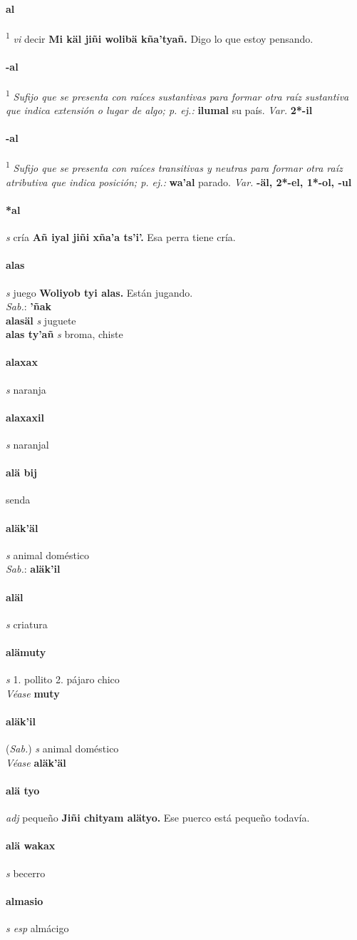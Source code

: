 \documentclass{scrbook}
\newcommand{\entry}[1]{\paragraph{#1}}
\newcommand{\onedefinition}[1]{#1.}
\newcommand{\defsuperscript}[1]{\textsuperscript{1}}
\newcommand{\nontranslationdef}[1]{\textit{#1}}
\newcommand{\partofspeech}[1]{\textit{#1}}
\newcommand{\spanishtranslation}[1]{#1}
\newcommand{\cholexample}[1]{\textbf{#1}}
\newcommand{\exampletranslation}[1]{#1}
\newcommand{\dialectvariant}[1]{\\\textit{#1}:}
\newcommand{\dialectword}[1]{\textbf{#1}}
\newcommand{\alsosee}[1]{\\\textit{Véase} \textbf{#1}}
\newcommand{\relevantdialect}[1]{(\textit{#1})}
\newcommand{\secondaryentry}[1]{\\\textbf{#1}}
\newcommand{\secondpartofspeech}[1]{\textit{#1}}
\newcommand{\secondtranslation}[1]{#1}
\newcommand{\variation}[1]{\textit{Var.} \textbf{#1}}
\begin{document}
\begin{multicols}{2}
\entry{al}
\defsuperscript{2}
\partofspeech{vi}
\spanishtranslation{decir}
\cholexample{Mi käl jiñi wolibä kña'tyañ.}
\exampletranslation{Digo lo que estoy pensando.}

\entry{-al}
\defsuperscript{1}
\nontranslationdef{Sufijo que se presenta con raíces sustantivas para formar otra raíz sustantiva que indica extensión o lugar de algo; p. ej.:}
\cholexample{ilumal}
\exampletranslation{su país.}
\variation{2*-il}

\entry{-al}
\defsuperscript{2}
\nontranslationdef{Sufijo que se presenta con raíces transitivas y neutras para formar otra raíz atributiva que indica posición; p. ej.:}
\cholexample{wa'al}
\exampletranslation{parado.}
\variation{-äl, 2*-el, 1*-ol, -ul}

\entry{*al}
\partofspeech{s}
\spanishtranslation{cría}
\cholexample{Añ iyal jiñi xña'a ts'i'.}
\exampletranslation{Esa perra tiene cría.}

\entry{alas}
\partofspeech{s}
\spanishtranslation{juego}
\cholexample{Woliyob tyi alas.}
\exampletranslation{Están jugando.}
\dialectvariant{Sab.}
\dialectword{'ñak}
\secondaryentry{alasäl}
\secondpartofspeech{s}
\secondtranslation{juguete}
\secondaryentry{alas ty'añ}
\secondpartofspeech{s}
\secondtranslation{broma, chiste}

\entry{alaxax}
\partofspeech{s}
\spanishtranslation{naranja}

\entry{alaxaxil}
\partofspeech{s}
\spanishtranslation{naranjal}

\entry{alä bij}
\spanishtranslation{senda}

\entry{aläk'äl}
\partofspeech{s}
\spanishtranslation{animal doméstico}
\dialectvariant{Sab.}
\dialectword{aläk'il}

\entry{aläl}
\partofspeech{s}
\spanishtranslation{criatura}

\entry{alämuty}
\partofspeech{s}
\onedefinition{1}
\spanishtranslation{pollito}
\onedefinition{2}
\spanishtranslation{pájaro chico}
\alsosee{muty}

\entry{aläk'il}
\relevantdialect{Sab.}
\partofspeech{s}
\spanishtranslation{animal doméstico}
\alsosee{aläk'äl}

\entry{alä tyo}
\partofspeech{adj}
\spanishtranslation{pequeño}
\cholexample{Jiñi chityam alätyo.}
\exampletranslation{Ese puerco está pequeño todavía.}

\entry{alä wakax}
\partofspeech{s}
\spanishtranslation{becerro}

\entry{almasio}
\partofspeech{s esp}
\spanishtranslation{almácigo}


\end{multicols}
\end{document}
